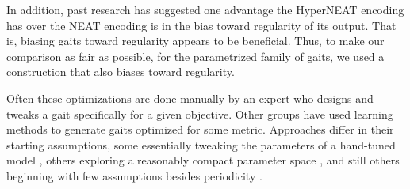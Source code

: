 In addition, past research has suggested \cite{jeffSomething} one advantage the HyperNEAT encoding has over the NEAT encoding is in the bias toward regularity of its output. That is, biasing gaits toward regularity appears to be beneficial. Thus, to make our comparison as fair as possible, for the parametrized family of gaits, we used a construction that also biases toward regularity.





Often
these optimizations are done manually by an expert who designs and
tweaks a gait specifically for a given objective.  Other groups have
used learning methods to generate gaits optimized for some metric.
Approaches differ in their starting assumptions, some essentially
tweaking the parameters of a hand-tuned model \cite{chernova}, others
exploring a reasonably compact parameter space \cite{kohl}, and still
others beginning with few assumptions besides periodicity
\cite{zykov}.












